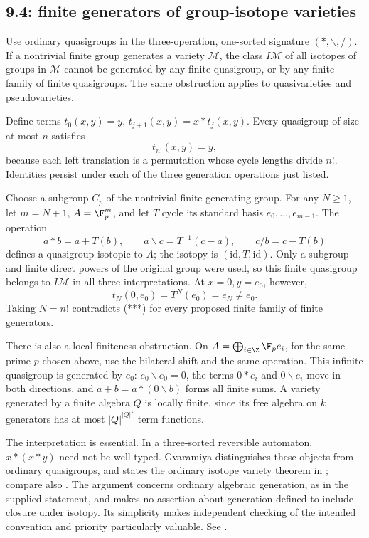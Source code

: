 \subsection{9.4: finite generators of group-isotope varieties}
\label{cand:9.4}
Use ordinary quasigroups in the three-operation, one-sorted signature
\((*,\backslash,/)\). If a nontrivial finite group generates a variety
\(\mathcal M\), the class \(I\mathcal M\) of all isotopes of groups in
\(\mathcal M\) cannot be generated by any finite quasigroup, or by any
finite family of finite quasigroups. The same obstruction applies to
quasivarieties and pseudovarieties.

Define terms \(t_0(x,y)=y\), \(t_{j+1}(x,y)=x*t_j(x,y)\).
Every quasigroup of size at most \(n\) satisfies
\[
 t_{n!}(x,y)=y,                                      \tag{***}
\]
because each left translation is a permutation whose cycle lengths
divide \(n!\). Identities persist under each of the three generation
operations just listed.

Choose a subgroup \(C_p\) of the nontrivial finite generating group.
For any \(N\ge1\), let \(m=N+1\), \(A=\F_p^m\), and let \(T\) cycle
its standard basis \(e_0,\ldots,e_{m-1}\).
The operation
\[
 a*b=a+T(b),\qquad
 a\backslash c=T^{-1}(c-a),\qquad c/b=c-T(b)
\]
defines a quasigroup isotopic to \(A\); the isotopy is
\((\mathrm{id},T,\mathrm{id})\). Only a subgroup and finite direct
powers of the original group were used, so this finite quasigroup
belongs to \(I\mathcal M\) in all three interpretations.
At \(x=0,y=e_0\), however,
\[
 t_N(0,e_0)=T^N(e_0)=e_N\ne e_0.
\]
Taking \(N=n!\) contradicts (***) for every proposed finite family of
finite generators.

There is also a local-finiteness obstruction. On
\(A=\bigoplus_{i\in\Z}\F_pe_i\), for the same prime \(p\) chosen above,
use the bilateral shift and the same
operation. This infinite quasigroup is generated by \(e_0\):
\(e_0\backslash e_0=0\), the terms \(0*e_i\) and
\(0\backslash e_i\) move in both directions, and
\(a+b=a*(0\backslash b)\) forms all finite sums.
A variety generated by a finite algebra \(Q\) is locally finite,
since its free algebra on \(k\) generators has at most
\(|Q|^{|Q|^k}\) term functions.

The interpretation is essential. In a three-sorted reversible automaton,
\(x*(x*y)\) need not be well typed. Gvaramiya distinguishes these
objects from ordinary quasigroups, and states the ordinary isotope
variety theorem in \cite[Section~3, Theorem~8]{gvaramiya-automata};
compare also \cite{krapez-marinkovic}.
The argument concerns ordinary algebraic generation, as in the supplied
statement, and makes no assertion about generation defined to include
closure under isotopy. Its simplicity makes independent checking of
the intended convention and priority particularly valuable.
See .
